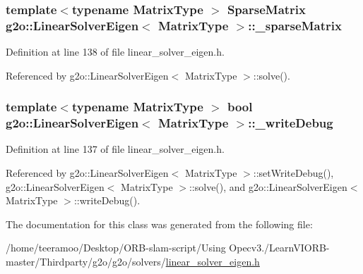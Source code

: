 \subsubsection[{\texorpdfstring{\+\_\+sparse\+Matrix}{_sparseMatrix}}]{\setlength{\rightskip}{0pt plus 5cm}template$<$typename Matrix\+Type $>$ {\bf Sparse\+Matrix} {\bf g2o\+::\+Linear\+Solver\+Eigen}$<$ Matrix\+Type $>$\+::\+\_\+sparse\+Matrix\hspace{0.3cm}{\ttfamily [protected]}}\hypertarget{classg2o_1_1LinearSolverEigen_a39682995a9cf32dc79848281c6d4d9b9}{}\label{classg2o_1_1LinearSolverEigen_a39682995a9cf32dc79848281c6d4d9b9}


Definition at line 138 of file linear\+\_\+solver\+\_\+eigen.\+h.



Referenced by g2o\+::\+Linear\+Solver\+Eigen$<$ Matrix\+Type $>$\+::solve().

\subsubsection[{\texorpdfstring{\+\_\+write\+Debug}{_writeDebug}}]{\setlength{\rightskip}{0pt plus 5cm}template$<$typename Matrix\+Type $>$ bool {\bf g2o\+::\+Linear\+Solver\+Eigen}$<$ Matrix\+Type $>$\+::\+\_\+write\+Debug\hspace{0.3cm}{\ttfamily [protected]}}\hypertarget{classg2o_1_1LinearSolverEigen_a2d331575853451fc94ca6f6420f0bdcb}{}\label{classg2o_1_1LinearSolverEigen_a2d331575853451fc94ca6f6420f0bdcb}


Definition at line 137 of file linear\+\_\+solver\+\_\+eigen.\+h.



Referenced by g2o\+::\+Linear\+Solver\+Eigen$<$ Matrix\+Type $>$\+::set\+Write\+Debug(), g2o\+::\+Linear\+Solver\+Eigen$<$ Matrix\+Type $>$\+::solve(), and g2o\+::\+Linear\+Solver\+Eigen$<$ Matrix\+Type $>$\+::write\+Debug().



The documentation for this class was generated from the following file\+:\begin{DoxyCompactItemize}
\item 
/home/teeramoo/\+Desktop/\+O\+R\+B-\/slam-\/script/\+Using Opecv3./\+Learn\+V\+I\+O\+R\+B-\/master/\+Thirdparty/g2o/g2o/solvers/\hyperlink{linear__solver__eigen_8h}{linear\+\_\+solver\+\_\+eigen.\+h}\end{DoxyCompactItemize}
